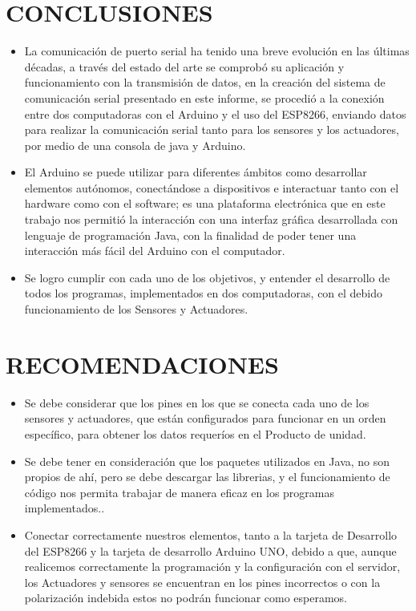 \documentclass[12pt]{report}
\begin{document}
 \section{CONCLUSIONES}
 \begin{itemize}
     \item La comunicación de puerto serial ha tenido una breve evolución en las últimas décadas, a través del estado del arte se comprobó su aplicación y funcionamiento con la transmisión de datos, en la creación del sistema de comunicación serial presentado en este informe, se procedió a la conexión entre dos computadoras con el Arduino y el uso del ESP8266, enviando datos para realizar la comunicación serial tanto para los sensores y los actuadores, por medio de una consola de java y Arduino.
     \item El Arduino se puede utilizar para diferentes ámbitos como desarrollar elementos autónomos, conectándose a dispositivos e interactuar tanto con el hardware como con el software; es una plataforma electrónica que en este trabajo nos permitió la interacción con una interfaz gráfica desarrollada con lenguaje de programación Java, con la finalidad de poder tener una interacción más fácil del Arduino con el computador.
     \item Se logro cumplir con cada uno de los objetivos, y entender el desarrollo de todos los programas, implementados en dos computadoras, con el debido funcionamiento de los Sensores y Actuadores.
 \end{itemize}

 \section{RECOMENDACIONES}
\begin{itemize}
    \item Se debe considerar que los pines en los que se conecta cada uno de los sensores y actuadores, que están configurados para funcionar en un orden específico, para obtener los datos requeríos en el Producto de unidad.
    \item Se debe tener en consideración que los paquetes utilizados en Java, no son propios de ahí, pero se debe descargar las librerias, y el funcionamiento de código nos permita trabajar de manera eficaz en los programas implementados..
    \item Conectar correctamente nuestros elementos, tanto a la tarjeta de Desarrollo del ESP8266 y la tarjeta de desarrollo Arduino UNO, debido a que, aunque realicemos correctamente la programación y la configuración con el servidor, los Actuadores y sensores se encuentran en los pines incorrectos o con la polarización indebida estos no podrán funcionar como esperamos.
\end{itemize}
\end{document}
